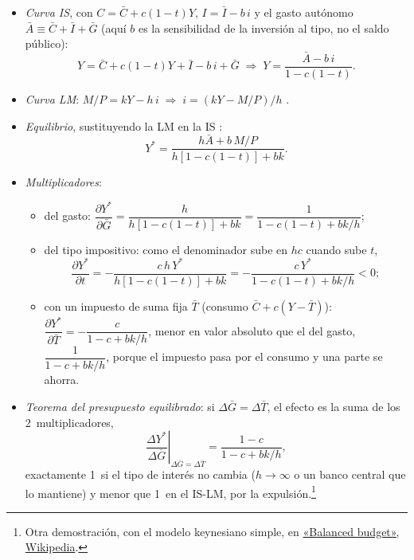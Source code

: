 \documentclass[11pt]{article}
\begin{document}
\begin{itemize}
\item \emph{Curva IS}, con $C=\bar C+c(1-t)Y$, $I=\bar I-b\,i$ y el gasto autónomo $\bar A\equiv\bar C+\bar I+\bar G$ (aquí $b$ es la sensibilidad de la inversión al tipo, no el saldo público):
  \begin{equation*}
  Y=\bar C+c(1-t)Y+\bar I-b\,i+\bar G\;\Longrightarrow\;Y=\frac{\bar A-b\,i}{1-c(1-t)} .
  \end{equation*}
\item \emph{Curva LM}: $M/P=kY-h\,i\;\Longrightarrow\;i=(kY-M/P)/h$ .
\item \emph{Equilibrio}, sustituyendo la LM en la IS :
  \begin{equation*}
  Y^*=\frac{h\bar A+b\,M/P}{h[1-c(1-t)]+bk} .
  \end{equation*}
\item \emph{Multiplicadores}:
  \begin{itemize}
  \item del gasto: $\dfrac{\partial Y^*}{\partial\bar G}=\dfrac{h}{h[1-c(1-t)]+bk}=\dfrac{1}{1-c(1-t)+bk/h}$;
  \item del tipo impositivo: como el denominador sube en $hc$ cuando sube $t$,
    \begin{equation*}
    \frac{\partial Y^*}{\partial t}=-\frac{c\,h\,Y^*}{h[1-c(1-t)]+bk}=-\frac{c\,Y^*}{1-c(1-t)+bk/h}<0;
    \end{equation*}
  \item con un impuesto de suma fija $\bar T$ (consumo $\bar C+c(Y-\bar T)$): $\dfrac{\partial Y^*}{\partial\bar T}=-\dfrac{c}{1-c+bk/h}$, menor en valor absoluto que el del gasto, $\dfrac{1}{1-c+bk/h}$, porque el impuesto pasa por el consumo y una parte se ahorra.
  \end{itemize}
\item \emph{Teorema del presupuesto equilibrado}\nocite{Haavelmo1945Multiplier}: si $\Delta\bar G=\Delta\bar T$, el efecto es la suma de los 2~multiplicadores,
  \begin{equation*}
  \left.\frac{\Delta Y^*}{\Delta\bar G}\right|_{\Delta\bar G=\Delta\bar T}=\frac{1-c}{1-c+bk/h},
  \end{equation*}
  exactamente 1~si el tipo de interés no cambia ($h\to\infty$ o un banco central que lo mantiene) y menor que 1~en el IS-LM, por la expulsión.\footnote{Otra demostración, con el modelo keynesiano simple, en \href{https://en.wikipedia.org/wiki/Balanced_budget}{«Balanced budget», Wikipedia}.}\findemo
\end{itemize}
\end{document}
